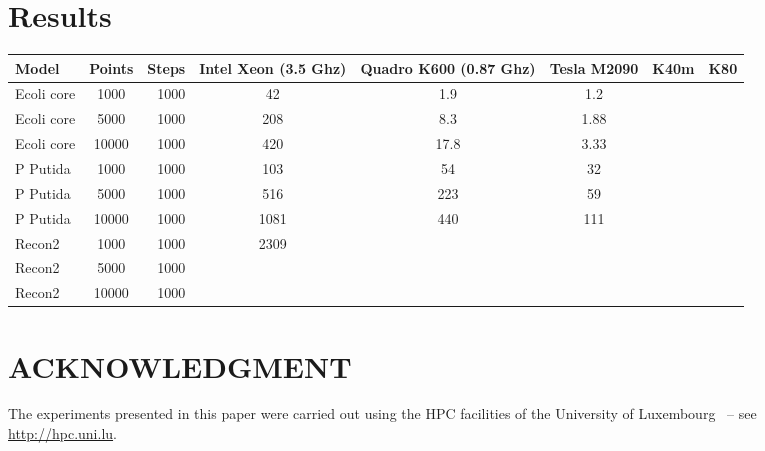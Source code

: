 \documentclass[letterpaper, 10 pt, conference]{ieeeconf}  %
\begin{document}
\section{Results}
\begin{tabular}{|l|c|r|c|c|c|c|c|}
  \hline
  Model & Points & Steps & Intel Xeon (3.5 Ghz) & Quadro K600 (0.87 Ghz) & Tesla M2090 & K40m & K80\\
  \hline
   Ecoli core& 1000& 1000& 42 & 1.9 & 1.2& &\\
   Ecoli core& 5000& 1000& 208 & 8.3 & 1.88& &\\
   Ecoli core& 10000& 1000& 420 & 17.8 & 3.33& &\\
   P Putida  & 1000& 1000& 103 & 54 & 32& &\\
   P Putida  & 5000& 1000& 516 &  223 & 59& &\\
   P Putida  & 10000& 1000& 1081 & 440 & 111& &\\
   Recon2  & 1000& 1000& 2309 & & & &\\
   Recon2  & 5000& 1000&  & & & &\\
   Recon2  & 10000& 1000&  & & & &\\
  \hline
\end{tabular}
\section*{ACKNOWLEDGMENT}

 The experiments presented in this paper were carried out
using the HPC facilities of the University of Luxembourg~\cite{VBCG_HPCS14} 
{\small -- see \url{http://hpc.uni.lu}}.




 

\end{document}
